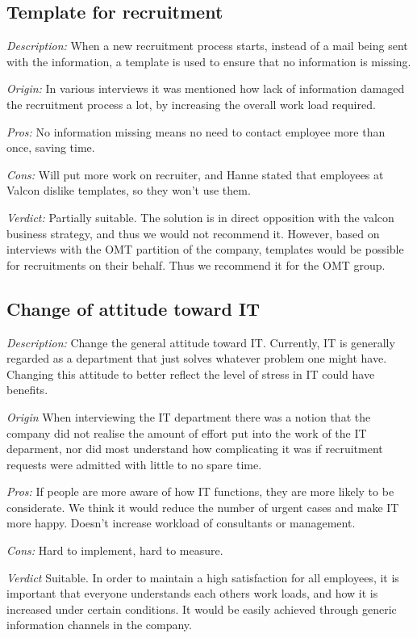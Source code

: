 \subsection{Template for recruitment}
\emph{Description:} When a new recruitment process starts, instead of a mail being sent with the information, a template is used to ensure that no information is missing.

\emph{Origin:}
In various interviews it was mentioned how lack of information damaged the recruitment process a lot, by increasing the overall work load required.

\noindent \emph{Pros:} No information missing means no need to contact employee more than once, saving time.

\noindent \emph{Cons:} Will put more work on recruiter, and Hanne stated that employees at Valcon dislike templates, so they won't use them.

\emph{Verdict:}
Partially suitable. The solution is in direct opposition with the valcon business strategy, and thus we would not recommend it. However, based on interviews with the OMT partition of the company, templates would be possible for recruitments on their behalf. Thus we recommend it for the OMT group.

\subsection{Change of attitude toward IT}
\emph{Description:} Change the general attitude toward IT. Currently, IT is generally regarded as a department that just solves whatever problem one might have. Changing this attitude to better reflect the level of stress in IT could have benefits.

\emph{Origin}
When interviewing the IT department there was a notion that the company did not realise the amount of effort put into the work of the IT deparment, nor did most understand how complicating it was if recruitment requests were admitted with little to no spare time.

\noindent \emph{Pros:} If people are more aware of how IT functions, they are more likely to be considerate. We think it would reduce the number of urgent cases and make IT more happy. Doesn't increase workload of consultants or management.

\noindent \emph{Cons:} Hard to implement, hard to measure.

\emph{Verdict}
Suitable. In order to maintain a high satisfaction for all employees, it is important that everyone understands each others work loads, and how it is increased under certain conditions. It would be easily achieved through generic information channels in the company.

